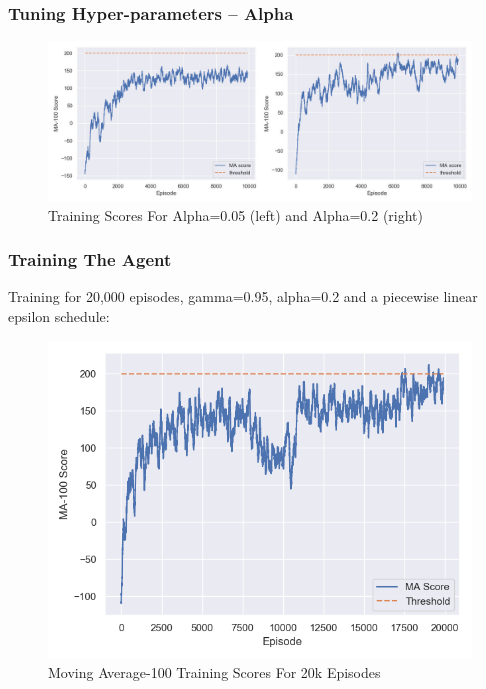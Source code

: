 \documentclass{beamer}
\begin{document}
\begin{frame}
\frametitle{Tuning Hyper-parameters -- Alpha}
\begin{figure}[H]
	\includegraphics[scale=0.33]{a}
	\centering
	\caption{Training Scores For Alpha=0.05 (left) and Alpha=0.2 (right)}
	\label{f:a}
\end{figure}

\end{frame}


\begin{frame}
\frametitle{Training The Agent}
Training for 20,000 episodes, gamma=0.95,
alpha=0.2 and a piecewise linear epsilon schedule:

\begin{figure}[H]
	\includegraphics[scale=0.3]{train}
	\centering
	\caption{Moving Average-100 Training Scores For 20k Episodes}
	\label{f:train}
\end{figure}

\end{frame}
\end{document}
